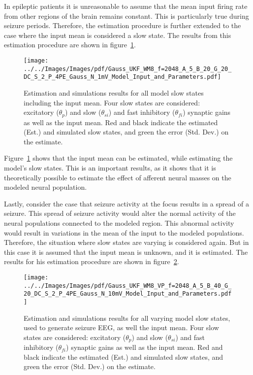 In epileptic patients it is unreasonable to assume that the mean input firing rate from other regions of the brain remains constant. This is particularly true during seizure periods. Therefore, the estimation procedure is further extended to the case where the input mean is considered a slow state. The results from this estimation procedure are shown in figure~\ref{fig: ESTMP4}.

\begin{figure}
	\centering
		\texttt{[image: ../../Images/Images/pdf/Gauss\_UKF\_WM8\_f=2048\_A\_5\_B\_20\_G\_20\_DC\_S\_2\_P\_4PE\_Gauss\_N\_1mV\_Model\_Input\_and\_Parameters.pdf]}
	\caption{Estimation and simulations results for all model slow states including the input mean. Four slow states are considered: excitatory ($\theta_{p}$) and slow ($\theta_{si}$) and fast inhibitory ($\theta_{fi}$) synaptic gains as well as the input mean. Red and black indicate the estimated (Est.) and simulated slow states, and green the error (Std. Dev.) on the estimate.}
	\label{fig: ESTMP4}
\end{figure}


Figure~\ref{fig: ESTMP4} shows that the input mean can be estimated, while estimating the model's slow states. This is an important results, as it shows that it is theoretically possible to estimate the effect of afferent neural masses on the modeled neural population.

Lastly, consider the case that seizure activity at the focus results in a spread of a seizure. This spread of seizure activity would alter the normal activity of the neural populations connected to the modeled region. This abnormal activity would result in variations in the mean of the input to the modeled populations. Therefore, the situation where slow states are varying is considered again. But in this case it is assumed that the input mean is unknown, and it is estimated. The results for his estimation procedure are shown in figure~\ref{fig: ESTMP4VP}.

\begin{figure}
	\centering
		\texttt{[image: ../../Images/Images/pdf/Gauss\_UKF\_WM8\_VP\_f=2048\_A\_5\_B\_40\_G\_20\_DC\_S\_2\_P\_4PE\_Gauss\_N\_10mV\_Model\_Input\_and\_Parameters.pdf]}
	\caption{Estimation and simulations results for all varying model slow states, used to generate seizure EEG, as well the input mean. Four slow states are considered: excitatory ($\theta_{p}$) and slow ($\theta_{si}$) and fast inhibitory ($\theta_{fi}$) synaptic gains as well as the input mean. Red and black indicate the estimated (Est.) and simulated slow states, and green the error (Std. Dev.) on the estimate.}
	\label{fig: ESTMP4VP}
\end{figure}

